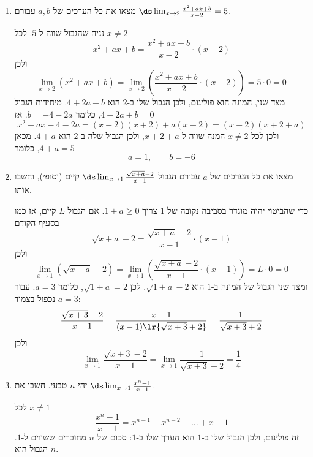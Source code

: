 \begin{enumerate}
\item מצאו את כל הערכים של $a,b$ עבורם $\ds\lim_{x\to2}\frac{x^2+ax+b}{x-2}=5$.
\ifsol
{}
\begin{solbox}
נניח שהגבול שווה ל-$5$. לכל $x\ne2$
\[x^2+ax+b=\frac{x^2+ax+b}{x-2}\cdot(x-2)\]
ולכן
\[\lim_{x\to2}\left(x^2+ax+b\right)=\lim_{x\to2}\left(\frac{x^2+ax+b}{x-2}\cdot(x-2)\right)=5\cdot0=0\]
מצד שני, המונה הוא פולינום, ולכן הגבול שלו ב-$2$ הוא $4+2a+b$. מיחידות הגבול $4+2a+b=0$, כלומר $b=-4-2a$. אז
\[x^2+ax-4-2a=(x-2)(x+2)+a(x-2)=(x-2)(x+2+a)\]
ולכן לכל $x\ne2$ המנה שווה ל-$x+2+a$, ולכן הגבול שלה ב-$2$ הוא $4+a$. מכאן $4+a=5$, כלומר
\[a=1,\qquad b=-6\]
\end{solbox}
\fi
\item מצאו את כל הערכים של $a$ עבורם הגבול $\ds\lim_{x\to1}\frac{\sqrt{x+a}-2}{x-1}$ קיים (וסופי), וחשבו אותו.
\ifsol
{}
\begin{solbox}
כדי שהביטוי יהיה מוגדר בסביבה נקובה של $1$ צריך $1+a\ge0$. אם הגבול $L$ קיים, אז כמו בסעיף הקודם
\[\sqrt{x+a}-2=\frac{\sqrt{x+a}-2}{x-1}\cdot(x-1)\]
ולכן
\[\lim_{x\to1}\left(\sqrt{x+a}-2\right)=\lim_{x\to1}\left(\frac{\sqrt{x+a}-2}{x-1}\cdot(x-1)\right)=L\cdot0=0\]
ומצד שני הגבול של המונה ב-$1$ הוא $\sqrt{1+a}-2$. לכן $\sqrt{1+a}=2$, כלומר $a=3$. עבור $a=3$ נכפול בצמוד:
\[\frac{\sqrt{x+3}-2}{x-1}=\frac{x-1}{(x-1)\lr{\sqrt{x+3}+2}}=\frac{1}{\sqrt{x+3}+2}\]
ולכן
\[\lim_{x\to1}\frac{\sqrt{x+3}-2}{x-1}=\lim_{x\to1}\frac{1}{\sqrt{x+3}+2}=\frac14\]
\end{solbox}
\fi
\item יהי $n$ טבעי. חשבו את $\ds\lim_{x\to1}\frac{x^n-1}{x-1}$.
\ifsol
{}
\begin{solbox}
לכל $x\ne1$
\[\frac{x^n-1}{x-1}=x^{n-1}+x^{n-2}+\dots+x+1\]
זה פולינום, ולכן הגבול שלו ב-$1$ הוא הערך שלו ב-$1$: סכום של $n$ מחוברים ששווים ל-$1$. הגבול הוא $n$.
\end{solbox}
\fi
\end{enumerate}
